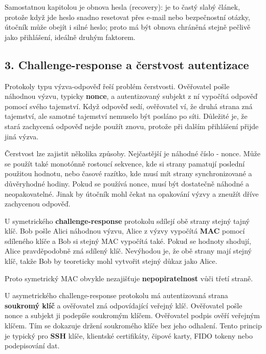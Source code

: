 Samostatnou kapitolou je obnova hesla (recovery): je to častý slabý článek, protože když jde heslo snadno resetovat přes e-mail nebo bezpečnostní otázky, útočník může obejít i silné heslo; proto má být obnova chráněná stejně pečlivě jako přihlášení, ideálně druhým faktorem.

\subsection*{3. Challenge-response a čerstvost autentizace}

Protokoly typu výzva-odpověď řeší problém čerstvosti. Ověřovatel pošle náhodnou výzvu, typicky \textbf{nonce}, a autentizovaný subjekt z ní vypočítá odpověď pomocí svého tajemství. Když odpověď sedí, ověřovatel ví, že druhá strana zná tajemství, ale samotné tajemství nemuselo být posláno po síti. Důležité je, že stará zachycená odpověď nejde použít znovu, protože při dalším přihlášení přijde jiná výzva.

Čerstvost lze zajistit několika způsoby. Nejčastější je náhodné číslo - nonce. Může se použít také monotónně rostoucí sekvence, kde si strany pamatují poslední použitou hodnotu, nebo časové razítko, kde musí mít strany synchronizované a důvěryhodné hodiny. Pokud se používá nonce, musí být dostatečně náhodné a neopakovatelné. Jinak by útočník mohl čekat na opakování výzvy a zneužít dříve zachycenou odpověď.

U symetrického \textbf{challenge-response} protokolu sdílejí obě strany stejný tajný klíč. Bob pošle Alici náhodnou výzvu, Alice z výzvy vypočítá \textbf{MAC} pomocí sdíleného klíče a Bob si stejný MAC vypočítá také. Pokud se hodnoty shodují, Alice pravděpodobně zná sdílený klíč. Nevýhodou je, že obě strany mají stejný klíč, takže Bob by teoreticky mohl vytvořit stejný důkaz jako Alice.

Proto symetrický MAC obvykle nezajišťuje \textbf{nepopiratelnost} vůči třetí straně.

U asymetrického challenge-response protokolu má autentizovaná strana \textbf{soukromý klíč} a ověřovatel zná odpovídající veřejný klíč. Ověřovatel pošle nonce a subjekt ji podepíše soukromým klíčem. Ověřovatel podpis ověří veřejným klíčem. Tím se dokazuje držení soukromého klíče bez jeho odhalení. Tento princip je typický pro \textbf{SSH} klíče, klientské certifikáty, čipové karty, FIDO tokeny nebo podepisování dat.


